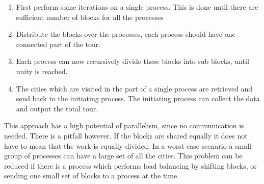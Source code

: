 \begin{enumerate}
\item First perform some iterations on a single process. This is done until
there are sufficient number of blocks for all the processes
\item Distribute the blocks over the processes, each process should have one
connected part of the tour.
\item Each process can now recursively divide these blocks into sub blocks,
until unity is reached.
\item The cities which are visited in the part of a single process are
retrieved and send back to the initiating process. The initiating process can collect the
data and output the total tour.
\end{enumerate}

This approach has a high potential of parallelism, since no communication is
needed. There is a pitfall however. If the blocks are shared equally it does
not have to mean that the work is equally divided. In a worst case scenario a
small group of processes can have a large set of all the cities. This problem
can be reduced if there is a process which performs load balancing by shifting
blocks, or sending one small set of blocks to a process at the time.

